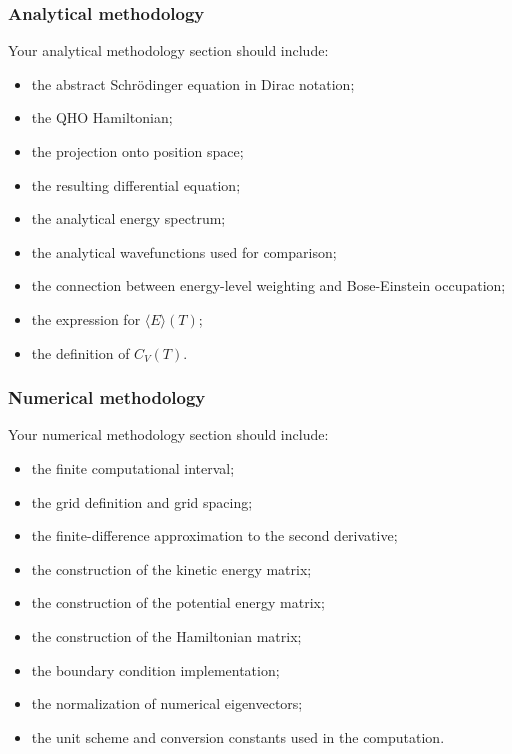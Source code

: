 \subsubsection{Analytical methodology}

Your analytical methodology section should include:

\begin{itemize}
    \item the abstract Schrödinger equation in Dirac notation;
    \item the QHO Hamiltonian;
    \item the projection onto position space;
    \item the resulting differential equation;
    \item the analytical energy spectrum;
    \item the analytical wavefunctions used for comparison;
    \item the connection between energy-level weighting and Bose-Einstein occupation;
    \item the expression for \(\langle E\rangle(T)\);
    \item the definition of \(C_V(T)\).
\end{itemize}

\subsubsection{Numerical methodology}

Your numerical methodology section should include:

\begin{itemize}
    \item the finite computational interval;
    \item the grid definition and grid spacing;
    \item the finite-difference approximation to the second derivative;
    \item the construction of the kinetic energy matrix;
    \item the construction of the potential energy matrix;
    \item the construction of the Hamiltonian matrix;
    \item the boundary condition implementation;
    \item the normalization of numerical eigenvectors;
    \item the unit scheme and conversion constants used in the computation.
\end{itemize}

